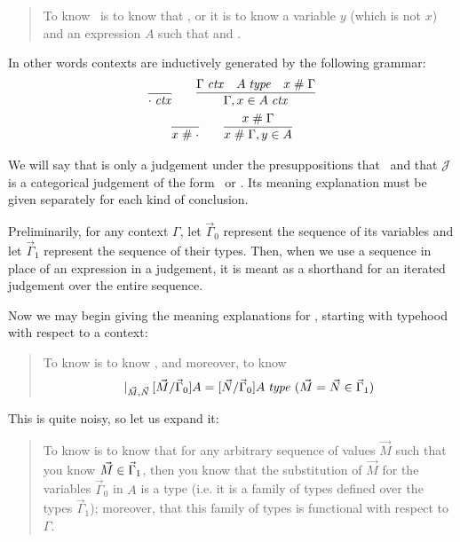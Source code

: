 \documentclass[main.tex]{subfiles}
\begin{document}
\begin{quote}
  To know \ is to know that \reduce{\Gamma}{\cdot}, or it is to know
  a variable $y$ (which is not $x$) and an expression $A$ such that 
  and .
\end{quote}

In other words contexts are inductively generated by the following grammar:
\begin{gather*}
  \infer{\isctx\cdot}{}
  \qquad
  \infer{
    \isctx{\Gamma,\ver{x}{A}}
  }{
    \isctx\Gamma &
    \isset{A} &
    \fresh{x}{\Gamma}
  }\\
  \infer{\fresh{x}{\cdot}}{}
  \qquad
  \infer{
    \fresh{x}{\Gamma,\ver{y}{A}}
  }{
    \fresh{x}{\Gamma}
  }
\end{gather*}

We will say that  is only a judgement under the
presuppositions that \isctx\Gamma\ and that $\mathcal{J}$ is a categorical
judgement of the form \ or . Its meaning explanation must be
given separately for each kind of conclusion.

Preliminarily, for any context $\Gamma$, let $\vec\Gamma_0$ represent the
sequence of its variables and let $\vec\Gamma_1$ represent the sequence of
their types. Then, when we use a sequence in place of an expression in a
judgement, it is meant as a shorthand for an iterated judgement over the entire
sequence.

Now we may begin giving the meaning explanations for
, starting with typehood with respect to a context:

\begin{quote}
  To know  is to know
  ,
  and moreover, to know
  \[\lvert_{\vec{M},\vec{N}}\,[\vec{M}/\vec\Gamma_0]A =
  [\vec{N}/\vec\Gamma_0]A\;\mathit{type}\ (\vec{M}=\vec{N}\in\vec\Gamma_1)\]
\end{quote}

This is quite noisy, so let us expand it:

\begin{quote}
  To know  is to know that for any arbitrary sequence
  of values $\vec{M}$ such that you know $\vec{M}\in\vec\Gamma_1$, then
  you know that the substitution of $\vec{M}$ for the variables $\vec\Gamma_0$
  in $A$ is a type (i.e. it is a family of types defined over the types
  $\vec\Gamma_1$); moreover, that this family of types is functional with
  respect to $\Gamma$.
\end{quote}
\end{document}
